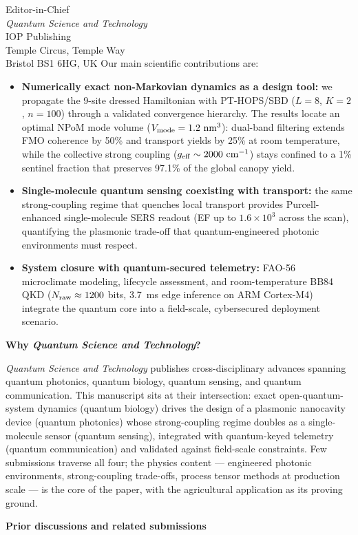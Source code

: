 \documentclass[11pt]{letter}
\begin{document}
\begin{letter}{Editor-in-Chief\\
\textit{Quantum Science and Technology}\\
IOP Publishing\\
Temple Circus, Temple Way\\
Bristol BS1 6HG, UK}
\noindent Our main scientific contributions are:
\begin{itemize}[nosep,leftmargin=*,itemsep=1pt]
\item \textbf{Numerically exact non-Markovian dynamics as a design tool:} we propagate the 9-site dressed Hamiltonian with PT-HOPS/SBD ($L=8$, $K=2$, $n=100$) through a validated convergence hierarchy. The results locate an optimal NPoM mode volume ($V_{\rm mode} = 1.2\text{ nm}^3$): dual-band filtering extends FMO coherence by 50\% and transport yields by 25\% at room temperature, while the collective strong coupling ($g_{\rm eff} \sim 2000\ \mathrm{cm^{-1}}$) stays confined to a 1\% sentinel fraction that preserves 97.1\% of the global canopy yield.
\item \textbf{Single-molecule quantum sensing coexisting with transport:} the same strong-coupling regime that quenches local transport provides Purcell-enhanced single-molecule SERS readout (EF up to $1.6\times10^3$ across the scan), quantifying the plasmonic trade-off that quantum-engineered photonic environments must respect.
\item \textbf{System closure with quantum-secured telemetry:} FAO-56 microclimate modeling, lifecycle assessment, and room-temperature BB84 QKD ($N_{\rm raw} \approx 1200$ bits, \qty{3.7}{\ms} edge inference on ARM Cortex-M4) integrate the quantum core into a field-scale, cybersecured deployment scenario.
\end{itemize}

\vspace{0.5em}
\noindent\textbf{Why \textit{Quantum Science and Technology}?}\nopagebreak

\noindent\textit{Quantum Science and Technology} publishes cross-disciplinary advances spanning quantum photonics, quantum biology, quantum sensing, and quantum communication. This manuscript sits at their intersection: exact open-quantum-system dynamics (quantum biology) drives the design of a plasmonic nanocavity device (quantum photonics) whose strong-coupling regime doubles as a single-molecule sensor (quantum sensing), integrated with quantum-keyed telemetry (quantum communication) and validated against field-scale constraints. Few submissions traverse all four; the physics content --- engineered photonic environments, strong-coupling trade-offs, process tensor methods at production scale --- is the core of the paper, with the agricultural application as its proving ground.

\vspace{0.5em}
\noindent\textbf{Prior discussions and related submissions}


\end{letter}
\end{document}

